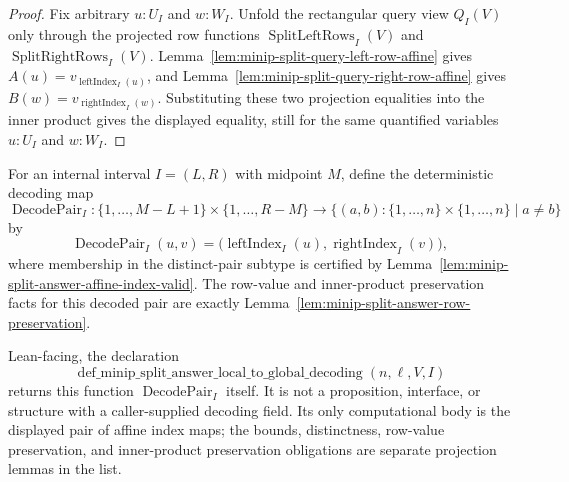 \begin{proof}
  Fix arbitrary $u:U_I$ and $w:W_I$.  Unfold the rectangular query view
  $Q_I(V)$ only through the projected row functions
  $\operatorname{SplitLeftRows}_I(V)$ and
  $\operatorname{SplitRightRows}_I(V)$.  Lemma~\ref{lem:minip-split-query-left-row-affine}
  gives
  $A(u)=v_{\operatorname{leftIndex}_I(u)}$, and
  Lemma~\ref{lem:minip-split-query-right-row-affine} gives
  $B(w)=v_{\operatorname{rightIndex}_I(w)}$.  Substituting these two
  projection equalities into the inner product gives the displayed equality,
  still for the same quantified variables $u:U_I$ and $w:W_I$.
\end{proof}

\begin{definition}
  \label{def:minip-split-answer-local-to-global-decoding}
  For an internal interval $I=(L,R)$ with midpoint $M$, define the deterministic
  decoding map
  \[
    \operatorname{DecodePair}_I:
      \{1,\ldots,M-L+1\}\times\{1,\ldots,R-M\}
      \to
      \{(a,b):\{1,\ldots,n\}\times\{1,\ldots,n\}\mid a\neq b\}
  \]
  by
  \[
    \operatorname{DecodePair}_I(u,v)
      =
    \bigl(\operatorname{leftIndex}_I(u),
          \operatorname{rightIndex}_I(v)\bigr),
  \]
  where membership in the distinct-pair subtype is certified by
  Lemma~\ref{lem:minip-split-answer-affine-index-valid}.  The row-value and
  inner-product preservation facts for this decoded pair are exactly
  Lemma~\ref{lem:minip-split-answer-row-preservation}.

  Lean-facing, the declaration
  \[
    \operatorname{def\_minip\_split\_answer\_local\_to\_global\_decoding}
      (n,\ell,V,I)
  \]
  returns this function $\operatorname{DecodePair}_I$ itself.  It is not a
  proposition, interface, or structure with a caller-supplied decoding field.
  Its only computational body is the displayed pair of affine index maps; the
  bounds, distinctness, row-value preservation, and inner-product preservation
  obligations are separate projection lemmas in the \uses list.
\end{definition}

